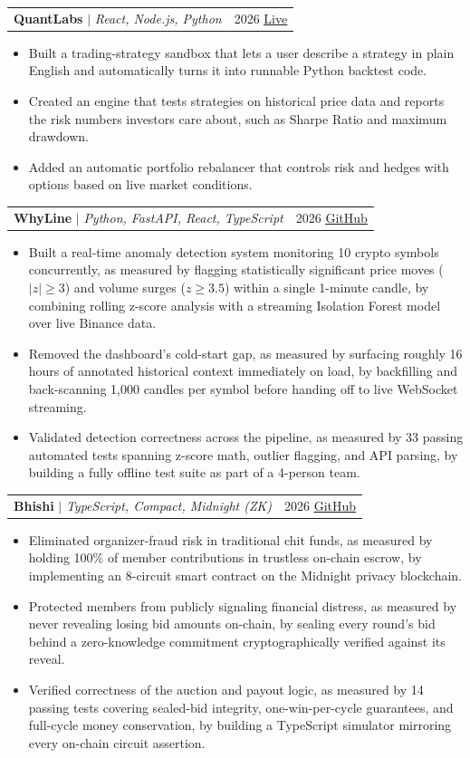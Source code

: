 \documentclass[letterpaper,11pt]{article}
\makeatletter
\newcommand{\resumeItem}[1]{
  \item\small{
    {#1 \vspace{-2pt}}
  }
}
\newcommand{\resumeProjectHeading}[2]{
    \item
    \begin{tabular*}{0.97\textwidth}{l@{\extracolsep{\fill}}r}
      \small#1 & #2 \\
    \end{tabular*}\vspace{-7pt}
}
\newcommand{\resumeItemListStart}{\begin{itemize}}
\newcommand{\resumeItemListEnd}{\end{itemize}\vspace{-5pt}}
\makeatother
\begin{document}
      \resumeProjectHeading
          {\textbf{QuantLabs} $|$ \emph{React, Node.js, Python}}{2026 \href{https://quant-ecru-seven.vercel.app/}{\underline{Live}}}
          \resumeItemListStart
            \resumeItem{Built a trading-strategy sandbox that lets a user describe a strategy in plain English and automatically turns it into runnable Python backtest code.}
            \resumeItem{Created an engine that tests strategies on historical price data and reports the risk numbers investors care about, such as Sharpe Ratio and maximum drawdown.}
            \resumeItem{Added an automatic portfolio rebalancer that controls risk and hedges with options based on live market conditions.}
          \resumeItemListEnd

      \resumeProjectHeading
          {\textbf{WhyLine} $|$ \emph{Python, FastAPI, React, TypeScript}}{2026 \href{https://github.com/rashcasm/WhyLine}{\underline{GitHub}}}
          \resumeItemListStart
            \resumeItem{Built a real-time anomaly detection system monitoring 10 crypto symbols concurrently, as measured by flagging statistically significant price moves ($|z|\geq3$) and volume surges ($z\geq3.5$) within a single 1-minute candle, by combining rolling z-score analysis with a streaming Isolation Forest model over live Binance data.}
            \resumeItem{Removed the dashboard's cold-start gap, as measured by surfacing roughly 16 hours of annotated historical context immediately on load, by backfilling and back-scanning 1,000 candles per symbol before handing off to live WebSocket streaming.}
            \resumeItem{Validated detection correctness across the pipeline, as measured by 33 passing automated tests spanning z-score math, outlier flagging, and API parsing, by building a fully offline test suite as part of a 4-person team.}
          \resumeItemListEnd

      \resumeProjectHeading
          {\textbf{Bhishi} $|$ \emph{TypeScript, Compact, Midnight (ZK)}}{2026
          \href{https://github.com/rashcasm/bhishi}{\underline{GitHub}}}
          \resumeItemListStart
            \resumeItem{Eliminated organizer-fraud risk in traditional chit funds, as measured by holding 100\% of member contributions in trustless on-chain escrow, by implementing an 8-circuit smart contract on the Midnight privacy blockchain.}
            \resumeItem{Protected members from publicly signaling financial distress, as measured by never revealing losing bid amounts on-chain, by sealing every round's bid behind a zero-knowledge commitment cryptographically verified against its reveal.}
            \resumeItem{Verified correctness of the auction and payout logic, as measured by 14 passing tests covering sealed-bid integrity, one-win-per-cycle guarantees, and full-cycle money conservation, by building a TypeScript simulator mirroring every on-chain circuit assertion.}
          \resumeItemListEnd
\end{document}
